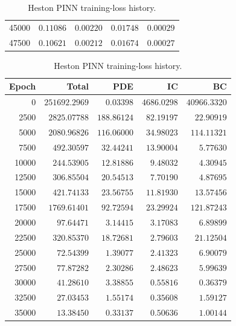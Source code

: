 \begin{table}[H]
\begin{minipage}[t]{0.48\linewidth}
\begin{tabular}{rrrrr}
             45000 & $0.11086$    & $0.00220$ & $0.01748$   & $0.00029$ \\
             47500 & $0.10621$    & $0.00212$ & $0.01674$   & $0.00027$ \\
            \hline
        \end{tabular}
    \end{minipage}\hfill
    \begin{minipage}[t]{0.48\linewidth}
        \centering
        \footnotesize
        \setlength{\tabcolsep}{3pt}
        \renewcommand{\arraystretch}{1.2}
        \caption{Heston PINN training-loss history.}
        \label{tab:heston_training_loss_history}
        \begin{tabular}{rrrrr}
            \hline
            \textbf{Epoch} & \textbf{Total} & \textbf{PDE} & \textbf{IC} & \textbf{BC} \\
            \hline
                 0 & $251692.2969$ & $0.03398$   & $4686.0298$ & $40966.3320$ \\
              2500 & $2825.07788$  & $188.86124$ & $82.19197$  & $22.90919$ \\
              5000 & $2080.96826$  & $116.06000$ & $34.98023$  & $114.11321$ \\
              7500 & $492.30597$   & $32.44241$  & $13.90004$  & $5.77630$ \\
             10000 & $244.53905$   & $12.81886$  & $9.48032$   & $4.30945$ \\
             12500 & $306.85504$   & $20.54513$  & $7.70190$   & $4.87695$ \\
             15000 & $421.74133$   & $23.56755$  & $11.81930$  & $13.57456$ \\
             17500 & $1769.61401$  & $92.72594$  & $23.29924$  & $121.87243$ \\
             20000 & $97.64471$    & $3.14415$   & $3.17083$   & $6.89899$ \\
             22500 & $320.85370$   & $18.72681$  & $2.79603$   & $21.12504$ \\
             25000 & $72.54399$    & $1.39077$   & $2.41323$   & $6.90079$ \\
             27500 & $77.87282$    & $2.30286$   & $2.48623$   & $5.99639$ \\
             30000 & $41.28610$    & $3.38855$   & $0.55816$   & $0.36379$ \\
             32500 & $27.03453$    & $1.55174$   & $0.35608$   & $1.59127$ \\
             35000 & $13.38450$    & $0.33137$   & $0.50636$   & $1.00144$ \\

\end{tabular}
\end{minipage}
\end{table}
